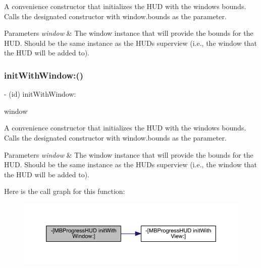 A convenience constructor that initializes the H\+UD with the window\textquotesingle{}s bounds. Calls the designated constructor with window.\+bounds as the parameter.


\begin{DoxyParams}{Parameters}
{\em window} & The window instance that will provide the bounds for the H\+UD. Should be the same instance as the H\+UD\textquotesingle{}s superview (i.\+e., the window that the H\+UD will be added to). \\
\hline
\end{DoxyParams}
\mbox{\label{interface_m_b_progress_h_u_d_a8f3c01167d59153c85ae7efdca7717fc}} 
\subsubsection{\texorpdfstring{init\+With\+Window\+:()}{initWithWindow:()}\hspace{0.1cm}{\footnotesize\ttfamily [2/3]}}
{\footnotesize\ttfamily -\/ (id) init\+With\+Window\+: \begin{DoxyParamCaption}\item[{(U\+I\+Window $\ast$)}]{window }\end{DoxyParamCaption}}

A convenience constructor that initializes the H\+UD with the window\textquotesingle{}s bounds. Calls the designated constructor with window.\+bounds as the parameter.


\begin{DoxyParams}{Parameters}
{\em window} & The window instance that will provide the bounds for the H\+UD. Should be the same instance as the H\+UD\textquotesingle{}s superview (i.\+e., the window that the H\+UD will be added to). \\
\hline
\end{DoxyParams}
Here is the call graph for this function\+:\nopagebreak
\begin{figure}[H]
\begin{center}
\leavevmode
\includegraphics[width=350pt]{interface_m_b_progress_h_u_d_a8f3c01167d59153c85ae7efdca7717fc_cgraph}
\end{center}
\end{figure}
\mbox{\label{interface_m_b_progress_h_u_d_a8f3c01167d59153c85ae7efdca7717fc}} 
